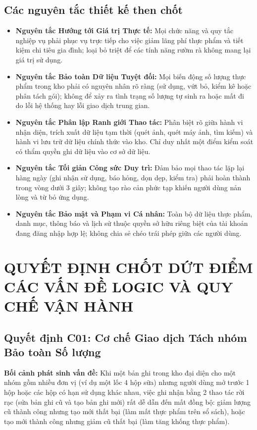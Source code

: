 \documentclass[10pt,a4paper]{article}
\begin{document}
\subsection{Các nguyên tắc thiết kế then chốt}
\begin{itemize}[itemsep=2pt]
    \item \textbf{Nguyên tắc Hướng tới Giá trị Thực tế:} Mọi chức năng và quy tắc nghiệp vụ phải phục vụ trực tiếp cho việc giảm lãng phí thực phẩm và tiết kiệm chi tiêu gia đình; loại bỏ triệt để các tính năng rườm rà không mang lại giá trị sử dụng.
    \item \textbf{Nguyên tắc Bảo toàn Dữ liệu Tuyệt đối:} Mọi biến động số lượng thực phẩm trong kho phải có nguyên nhân rõ ràng (sử dụng, vứt bỏ, kiểm kê hoặc phân tách gói); không để xảy ra tình trạng số lượng tự sinh ra hoặc mất đi do lỗi hệ thống hay lỗi giao dịch trung gian.
    \item \textbf{Nguyên tắc Phân lập Ranh giới Thao tác:} Phân biệt rõ giữa hành vi nhận diện, trích xuất dữ liệu tạm thời (quét ảnh, quét máy ảnh, tìm kiếm) và hành vi lưu trữ dữ liệu chính thức vào kho. Chỉ duy nhất một điểm kiểm soát có thẩm quyền ghi dữ liệu vào cơ sở dữ liệu.
    \item \textbf{Nguyên tắc Tối giản Công sức Duy trì:} Đảm bảo mọi thao tác lặp lại hàng ngày (ghi nhận sử dụng, báo hỏng, dọn dẹp, kiểm tra) phải hoàn thành trong vòng dưới 3 giây; không tạo rào cản phức tạp khiến người dùng nản lòng và từ bỏ ứng dụng.
    \item \textbf{Nguyên tắc Bảo mật và Phạm vi Cá nhân:} Toàn bộ dữ liệu thực phẩm, danh mục, thông báo và lịch sử thuộc quyền sở hữu riêng biệt của tài khoản đang đăng nhập hợp lệ; không chia sẻ chéo trái phép giữa các người dùng.
\end{itemize}

\section{QUYẾT ĐỊNH CHỐT DỨT ĐIỂM CÁC VẤN ĐỀ LOGIC VÀ QUY CHẾ VẬN HÀNH}

\subsection{Quyết định C01: Cơ chế Giao dịch Tách nhóm Bảo toàn Số lượng}
\textbf{Bối cảnh phát sinh vấn đề:} Khi một bản ghi trong kho đại diện cho một nhóm gồm nhiều đơn vị (ví dụ một lốc 4 hộp sữa) nhưng người dùng mở trước 1 hộp hoặc các hộp có hạn sử dụng khác nhau, việc ghi nhận bằng 2 thao tác rời rạc (sửa bản ghi cũ và tạo bản ghi mới) rất dễ dẫn đến mất đồng bộ: giảm lượng cũ thành công nhưng tạo mới thất bại (làm mất thực phẩm trên sổ sách), hoặc tạo mới thành công nhưng giảm cũ thất bại (làm tăng khống thực phẩm).
\end{document}
